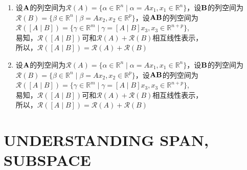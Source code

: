 \documentclass[english,onecolumn,UTF8]{IEEEtran}
\begin{document}
\begin{enumerate}
\begin{enumerate}
\item 设$\bold A $的列空间为$\mathcal{R}(A)=\{ \alpha\in \mathbb{R}^n  \mid \alpha =Ax_1,x_1\in \mathbb{R}^n\}$，设$\bold B$的列空间为$\mathcal{R}(B)=\{ \beta\in \mathbb{R}^n  \mid \beta =Ax_2,x_2\in \mathbb{R}^p\}$，设$\bold A \bold B$的列空间为$\mathcal{R}(\left[ A\mid B\right])=\{ \gamma\in \mathbb{R}^m  \mid \gamma =\left[ A\mid B \right]x_3,x_3\in \mathbb{R}^{n+p}\}$,
\\易知，$\mathcal{R}(\left[ A\mid B\right])$可和$\mathcal{R}(A)+\mathcal{R}(B)$相互线性表示，
\\所以，$\mathcal{R}(\left[ A\mid B\right])=\mathcal{R}(A)+\mathcal{R}(B)$


\item 设$\bold A $的列空间为$\mathcal{R}(A)=\{ \alpha\in \mathbb{R}^n  \mid \alpha =Ax_1,x_1\in \mathbb{R}^n\}$，设$\bold B$的列空间为$\mathcal{R}(B)=\{ \beta\in \mathbb{R}^n  \mid \beta =Ax_2,x_2\in \mathbb{R}^p\}$，设$\bold A \bold B$的列空间为$\mathcal{R}(\left[ A\mid B\right])=\{ \gamma\in \mathbb{R}^m  \mid \gamma =\left[ A\mid B \right]x_3,x_3\in \mathbb{R}^{n+p}\}$,
\\易知，$\mathcal{R}(\left[ A\mid B\right])$可和$\mathcal{R}(A)+\mathcal{R}(B)$相互线性表示，
\\所以，$\mathcal{R}(\left[ A\mid B\right])=\mathcal{R}(A)+\mathcal{R}(B)$

	\end{enumerate}


\end{enumerate}



	




\section{UNDERSTANDING SPAN, SUBSPACE}
\end{document}

